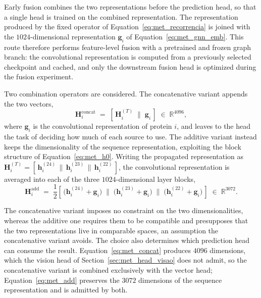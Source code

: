 \documentclass[Ingles]{ic-tese-v3}
\begin{document}
Early fusion combines the two representations before the prediction head, so that a single
head is trained on the combined representation. The representation produced by the fixed operator of
Equation~\eqref{eq:met_recorrencia} is joined with the $1024$-dimensional representation
$\mathbf{g}_i$ of Equation~\eqref{eq:met_gnn_emb}. This route therefore performs feature-level
fusion
with a pretrained and frozen graph branch: the convolutional representation is computed from a
previously selected checkpoint and cached, and only the downstream fusion head is optimized during
the fusion experiment.

Two combination operators are considered. The concatenative variant appends the two vectors,
\begin{equation}
  \mathbf{H}^{\text{concat}}_i \;=\;
  \left[\, \mathbf{H}^{(T)}_i \;\big\|\; \mathbf{g}_i \,\right] \;\in\; \mathbb{R}^{4096},
  \label{eq:met_concat}
\end{equation}
\noindent where $\mathbf{g}_i$ is the convolutional representation of protein $i$, and leaves to the head the
task of deciding how much of each source to use. The additive variant instead keeps the
dimensionality of the sequence representation, exploiting the block structure of
Equation~\eqref{eq:met_h0}. Writing the propagated representation as
$\mathbf{H}^{(T)}_i = [\, \mathbf{h}^{(24)}_i \,\|\, \mathbf{h}^{(23)}_i \,\|\, \mathbf{h}^{(22)}_i \,]$,
the convolutional representation is averaged into each of the three $1024$-dimensional layer blocks,
\begin{equation}
  \mathbf{H}^{\text{add}}_i \;=\;
  \frac{1}{2}\left[\,
    \bigl(\mathbf{h}^{(24)}_i + \mathbf{g}_i\bigr) \;\big\|\;
    \bigl(\mathbf{h}^{(23)}_i + \mathbf{g}_i\bigr) \;\big\|\;
    \bigl(\mathbf{h}^{(22)}_i + \mathbf{g}_i\bigr)
  \,\right] \;\in\; \mathbb{R}^{3072}.
  \label{eq:met_add}
\end{equation}

The concatenative variant imposes no constraint on the two dimensionalities, whereas the additive one
requires them to be compatible and presupposes that the two representations live in comparable
spaces, an assumption the concatenative variant avoids. The choice also determines which prediction
head can consume the result. Equation~\eqref{eq:met_concat} produces $4096$ dimensions, which the
vision head of Section~\ref{sec:met_head_visao} does not admit, so the concatenative variant is
combined exclusively with the vector head; Equation~\eqref{eq:met_add} preserves the $3072$
dimensions of the sequence representation and is admitted by both.
\end{document}
